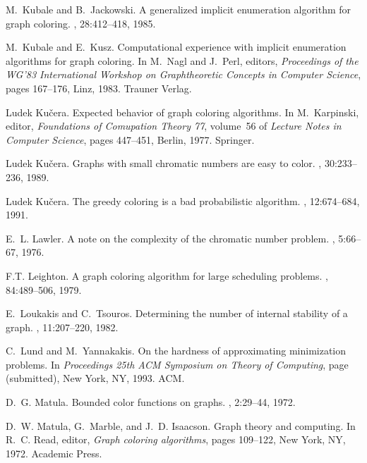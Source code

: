 \begin{thebibliography}{10}
M.~Kubale and B.~Jackowski.
\newblock A generalized implicit enumeration algorithm for graph coloring.
, 28:412--418, 1985.

M.~Kubale and E.~Kusz.
\newblock Computational experience with implicit enumeration algorithms for
  graph coloring.
\newblock In M.~Nagl and J.~Perl, editors, {\em Proceedings of the WG'83
  International Workshop on Graphtheoretic Concepts in Computer Science}, pages
  167--176, Linz, 1983. Trauner Verlag.

Ludek Ku{\v c}era.
\newblock Expected behavior of graph coloring algorithms.
\newblock In M.~Karpinski, editor, {\em Foundations of Comupation Theory 77},
  volume~56 of {\em Lecture Notes in Computer Science}, pages 447--451, Berlin,
  1977. Springer.

Ludek Ku{\v c}era.
\newblock Graphs with small chromatic numbers are easy to color.
, 30:233--236, 1989.

Ludek Ku{\v c}era.
\newblock The greedy coloring is a bad probabilistic algorithm.
, 12:674--684, 1991.

E.~L. Lawler.
\newblock A note on the complexity of the chromatic number problem.
, 5:66--67, 1976.

F.T. Leighton.
\newblock A graph coloring algorithm for large scheduling problems.
,
  84:489--506, 1979.

E.~Loukakis and C.~Tsouros.
\newblock Determining the number of internal stability of a graph.
, 11:207--220,
  1982.

C.~Lund and M.~Yannakakis.
\newblock On the hardness of approximating minimization problems.
\newblock In {\em Proceedings 25th {ACM} {S}ymposium on {T}heory of
  {C}omputing}, page (submitted), New York, NY, 1993. ACM.

D.~G. Matula.
\newblock Bounded color functions on graphs.
, 2:29--44, 1972.

D.~W. Matula, G.~Marble, and J.~D. Isaacson.
\newblock Graph theory and computing.
\newblock In R.~C. Read, editor, {\em Graph coloring algorithms}, pages
  109--122, New York, NY, 1972. Academic Press.


\end{thebibliography}
